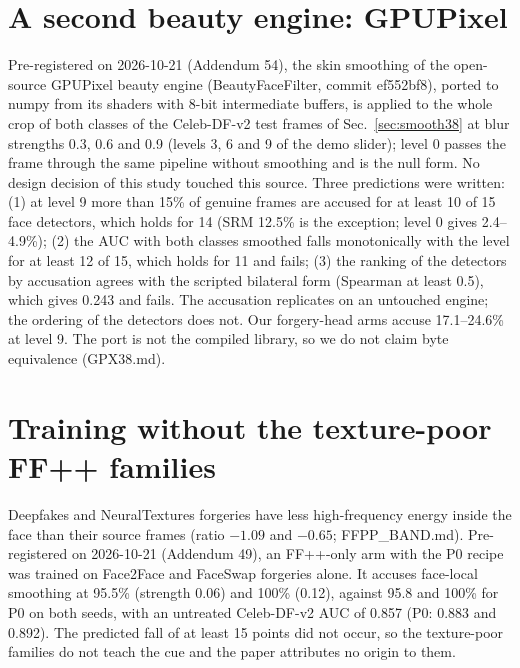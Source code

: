 \documentclass[10pt]{article}
\begin{document}
\section{A second beauty engine: GPUPixel}
\label{sec:gpx}
Pre-registered on 2026-10-21 (Addendum 54), the skin smoothing of the open-source GPUPixel beauty engine (BeautyFaceFilter,
commit ef552bf8), ported to numpy from its shaders with 8-bit intermediate buffers, is applied to the whole crop of both classes
of the Celeb-DF-v2 test frames of Sec.~\ref{sec:smooth38} at blur strengths 0.3, 0.6 and 0.9 (levels 3, 6 and 9 of the demo
slider); level 0 passes the frame through the same pipeline without smoothing and is the null form. No design
decision of this study touched this source. Three predictions were written: (1) at level 9 more than 15\% of genuine frames
are accused for at least 10 of 15 face detectors, which holds for 14 (SRM 12.5\% is the exception; level 0 gives 2.4--4.9\%);
(2) the AUC with both classes smoothed falls monotonically with the level for at least 12 of 15, which holds for 11 and fails;
(3) the ranking of the detectors by accusation agrees with the scripted bilateral form (Spearman at least 0.5), which gives
0.243 and fails. The accusation replicates on an untouched engine; the ordering of the detectors does not. Our forgery-head
arms accuse 17.1--24.6\% at level 9. The port is not the compiled library, so we do not claim byte equivalence (GPX38.md).

\section{Training without the texture-poor FF++ families}
\label{sec:noDFNT}
Deepfakes and NeuralTextures forgeries have less high-frequency energy inside the face than their source frames (ratio $-1.09$
and $-0.65$; FFPP\_BAND.md). Pre-registered on 2026-10-21 (Addendum 49), an FF++-only arm with the P0 recipe was trained on
Face2Face and FaceSwap forgeries alone. It accuses face-local smoothing at 95.5\% (strength 0.06) and 100\% (0.12), against
95.8 and 100\% for P0 on both seeds, with an untreated Celeb-DF-v2 AUC of 0.857 (P0: 0.883 and 0.892). The predicted fall of
at least 15 points did not occur, so the texture-poor families do not teach the cue and the paper attributes no origin to them.
\end{document}
